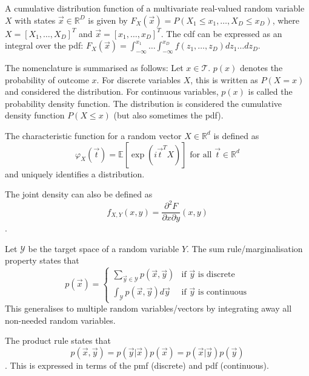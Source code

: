 A cumulative distribution function of a multivariate real-valued
random variable $X$ with states $\vec{x} \in \mathbb{R}^D$ is
given by
$F_X(\vec{x}) = P(X_1 \leq x_1, \dotsc, X_D \leq x_D)$,
where $X = [X_1, \dotsc, X_D]^T$ and $\vec{x} = [x_1, \dotsc, x_D]^T$.
The cdf can be expressed as an integral over the pdf:
$F_X(\vec{x}) = \int_{-\infty}^{x_1}{\dots \int_{-\infty}^{x_D}{f(z_1, \dotsc, z_D) dz_1 \dots dz_D}}$.

The nomenclature is summarised as follows:
Let $x \in \mathcal{T}$. $p(x)$ denotes the probability of outcome $x$.
For discrete variables $X$, this is written as $P(X = x)$ and
considered the distribution.
For continuous variables, $p(x)$ is called the probability density function.
The distribution is considered the cumulative density function $P(X \leq x)$ (but also sometimes the pdf).

The characteristic function for a random vector $X \in \mathbb{R}^d$ is defined as
\begin{equation*}
    \varphi_X(\vec{t}) = \mathbb{E}[\exp{(i \vec{t}^T X)}] \text{ for all $\vec{t} \in \mathbb{R}^d$}
\end{equation*}
and uniquely identifies a distribution.

The joint density can also be defined as
\begin{equation*}
    f_{X, Y}(x, y) =
        \frac{\partial^2 F}{\partial x \partial y}(x, y)
\end{equation*}.

Let $\mathcal{Y}$ be the target space of a random variable $Y$.
The sum rule/marginalisation property states that
\begin{equation*}
    p(\vec{x}) =
    \begin{cases}
        \sum_{\vec{y} \in \mathcal{Y}}{p(\vec{x}, \vec{y})} & \text{if $\vec{y}$ is discrete} \\
        \int_\mathcal{Y}{p(\vec{x}, \vec{y}) d\vec{y}} & \text{if $\vec{y}$ is continuous}
    \end{cases}
\end{equation*}
This generalises to multiple random variables/vectors by integrating
away all non-needed random variables.

The product rule states that
\begin{equation*}
    p(\vec{x}, \vec{y})
    = p(\vec{y} | \vec{x}) p(\vec{x})
    = p(\vec{x} | \vec{y}) p(\vec{y})
\end{equation*}.
This is expressed in terms of the pmf (discrete) and pdf (continuous).

